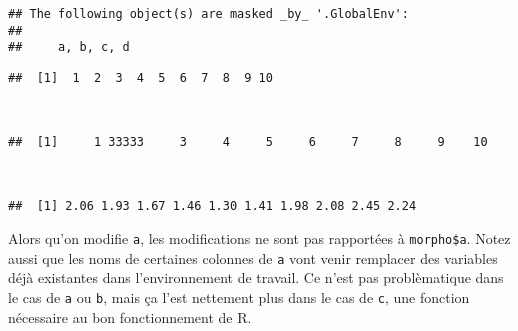 \begin{knitrout}
\color{fgcolor}\begin{kframe}
\begin{flushleft}
\ttfamily\noindent
{}\hlkeyword{(}\hlkeyword{)}\mbox{}
\normalfont
\end{flushleft}
\begin{verbatim}
## The following object(s) are masked _by_ '.GlobalEnv':
## 
##     a, b, c, d
\end{verbatim}
\begin{flushleft}
\ttfamily\noindent
{}\hlkeyword{[}\hlkeyword{(}\hlkeyword{:}\hlkeyword{)}\hlkeyword{]}\mbox{}
\normalfont
\end{flushleft}
\begin{verbatim}
##  [1]  1  2  3  4  5  6  7  8  9 10
\end{verbatim}
\begin{flushleft}
\ttfamily\noindent
{}\hlkeyword{[}\hlkeyword{]}{\ }\hlassignement{\usebox{\hlnormalsizeboxlessthan}-}{\ }\hspace*{\fill}\\
\hlstd{}\hlkeyword{[}\hlkeyword{(}\hlkeyword{:}\hlkeyword{)}\hlkeyword{]}\mbox{}
\normalfont
\end{flushleft}
\begin{verbatim}
##  [1]     1 33333     3     4     5     6     7     8     9    10
\end{verbatim}
\begin{flushleft}
\ttfamily\noindent
{}\hlkeyword{(}\hlkeyword{)}\hspace*{\fill}\\
\hlstd{}\hlkeyword{\usebox{\hlnormalsizeboxdollar}}\hlkeyword{[}\hlkeyword{(}\hlkeyword{:}\hlkeyword{)}\hlkeyword{]}\mbox{}
\normalfont
\end{flushleft}
\begin{verbatim}
##  [1] 2.06 1.93 1.67 1.46 1.30 1.41 1.98 2.08 2.45 2.24
\end{verbatim}
\end{kframe}
\end{knitrout}


\noindent Alors qu'on modifie \texttt{a}, les modifications ne sont pas rapportées à \texttt{morpho\$a}.
Notez aussi que les noms de certaines colonnes de \texttt{a} vont venir remplacer des variables déjà existantes dans l'environnement de travail.
Ce n'est pas problèmatique dans le cas de \texttt{a} ou \texttt{b}, mais ça l'est nettement plus dans le cas de \texttt{c}, une fonction nécessaire au bon fonctionnement de R.  

